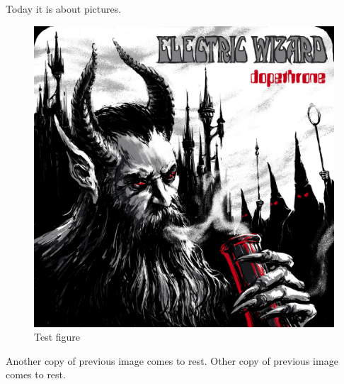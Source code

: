 \documentclass{article}
\begin{document}
    Today it is about pictures.
    \begin{figure}[H]  %
        \centering
        \includegraphics[scale=0.2]{./dopethrone.jpg} %
        \caption{Test figure}
    \end{figure}

    Another copy of previous image comes to rest.
    Other copy of previous image comes to rest.
\end{document}
